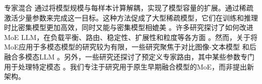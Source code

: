  专家混合 \citep{shazeer2017outrageously} 通过将模型规模与每样本计算解耦，实现了模型容量的扩展。通过稀疏激活少量参数来完成这一目标。这种方法促成了大型稀疏模型，它们在训练和推理时比密集模型更加高效，同时又能与密集模型相媲美 \citep{fedus2022switch,sun2024hunyuan,jiang2024mixtral,liu2024deepseekv3,wei2024skywork}。许多研究探讨了如何改进MoE LLM，在负载平衡、路由、稳定性、扩展性和粒度等各方面 \citep{lewis2021base,zoph2022st,lepikhin2020gshard}。然而，关于将MoE应用于多模态模型的研究较为有限，一些研究聚焦于对比图像-文本模型 \citep{mustafa2022multimodal} 和后融合多模态LLM \citep{lin2024moe,li2024aria}。另外，一些研究还探讨了预定义专家路由，其中某些参数专门用于处理特定模态 \citep{bao2021vlmo,chen2024eve,shen2023scaling}。我们专注于研究用于原生早期融合模型的MoE，而非提出新架构。


